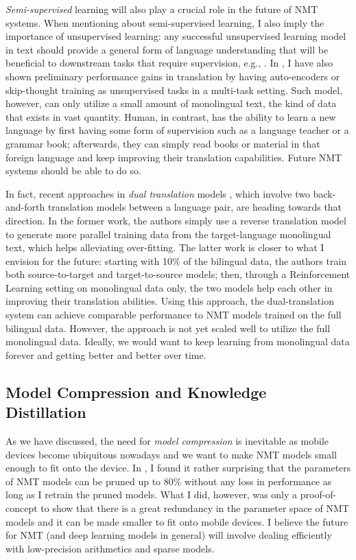 {\it Semi-supervised} learning will also play a crucial role in the future of NMT systems. When mentioning about semi-supervised learning, I also imply the importance of unsupervised learning: any successful unsupervised learning model in text should provide a general form of language understanding that will be beneficial to downstream tasks that require supervision, e.g., \cite{dai15}.
In , I have also shown preliminary performance gains in translation by having auto-encoders or skip-thought training as unsupervised tasks in a multi-task setting. Such model, however, can only utilize a small amount of monolingual text, the kind of data that exists in vast quantity. Human, in contrast, has the ability to learn a new language by first having some form of supervision such as a language teacher or a grammar book; afterwards, they can simply read books or material in that foreign language and keep improving their translation capabilities. Future NMT systems should be able to do so. 

In fact, recent approaches in {\it dual translation} models \cite{sennrich16mono,xia16}, which involve two back-and-forth translation models between a language pair, are heading towards that direction. In the former work, the authors simply use a reverse translation model to generate more parallel training data from the target-language monolingual text, which helps alleviating over-fitting. The latter work is closer to what I envision for the future: starting with 10\% of the bilingual data, the authors train both source-to-target and target-to-source models; then, through a Reinforcement Learning setting on monolingual data only, the two models help each other in improving their translation abilities. Using this approach, the dual-translation system can achieve comparable performance to NMT models trained on the full bilingual data. However, the approach is not yet scaled well to utilize the full monolingual data. Ideally, we would want to keep learning from monolingual data forever and getting better and better over time.

\subsection{Model Compression and Knowledge Distillation}
As we have discussed, the need for {\it model compression} is inevitable as mobile devices become ubiquitous nowadays and we want to make NMT models small enough to fit onto the device. In , I found it rather surprising that the parameters of NMT models can be pruned up to 80\% without any loss in performance as long as I retrain the pruned models. What I did, however, was only a proof-of-concept to show that there is a great redundancy in the parameter space of NMT models and it can be made smaller to fit onto mobile devices. I believe the future for NMT (and deep learning models in general) will involve dealing efficiently with low-precision arithmetics \cite{courbariaux2015low,gupta15} and sparse models.

